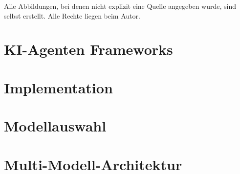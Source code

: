 

\setlength{\headheight}{27.35pt} %
\setlength{\footheight}{18.85pt}  %
\setlength{\footskip}{30pt}        %

% 
\pagestyle{empty}



\newpage
\pagestyle{scrheadings}
\thispagestyle{firstPage}
\tableofcontents
\newpage
\thispagestyle{firstPage}
\listoffigures
Alle Abbildungen, bei denen nicht explizit eine Quelle angegeben wurde, sind selbst erstellt. Alle Rechte liegen beim Autor.
\newpage
\thispagestyle{firstPage}
\lstlistoflistings
\newpage
\thispagestyle{firstPage}
\listoftables  
\newpage
\setcounter{page}{1}
\section{KI-Agenten Frameworks}

\section{Implementation}

\section{Modellauswahl}

\section{Multi-Modell-Architektur}

\newpage
\printbibliography
\newpage
\thispagestyle{firstPage}

\appendix

